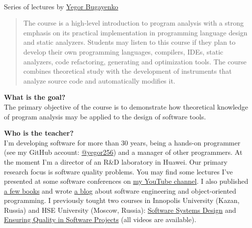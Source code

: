 \documentclass[nobrand,anonymous,nodate,nosecurity]{huawei}
\begin{document}
{\\
Series of lectures by \href{https://www.yegor256.com}{Yegor Bugayenko}


\begin{abstract}
The course is a high-level introduction to program analysis with a
strong emphasis on its practical implementation in programming language
design and static analyzers. Students may listen to this
course if they plan to develop their own programming languages,
compilers, IDEs, static analyzers, code refactoring, generating and optimization tools.
The course combines theoretical study with the development of
instruments that analyze source code and automatically modifies it.
\end{abstract}


\textbf{What is the goal?}\\
The primary objective of the course is to demonstrate
how theoretical knowledge of program analysis may be applied to
the design of software tools.

\textbf{Who is the teacher?}\\
I'm developing software for more than 30 years, being a hands-on programmer
(see my GitHub account: \href{https://github.com/yegor256}{@yegor256})
and a manager of other programmers. At the moment I'm a director
of an R\&D laboratory in Huawei. Our primary research focus is
software quality problems. You may find some lectures I've presented
at some software conferences on
\href{https://www.youtube.com/channel/UCr9qCdqXLm2SU0BIs6d_68Q}{my YouTube channel}.
I also published \href{https://www.yegor256.com/books.html}{a few books}
and wrote \href{https://www.yegor256.com/contents.html}{a blog} about software engineering
and object-oriented programming.
I previously tought two courses in
Innopolis University (Kazan, Russia)
and HSE University (Moscow, Russia):
\href{https://github.com/yegor256/ssd16}{Software Systems Design}
and
\href{https://github.com/yegor256/eqsp}{Ensuring Quality in Software Projects}
(all videos are available).

}
\end{document}
